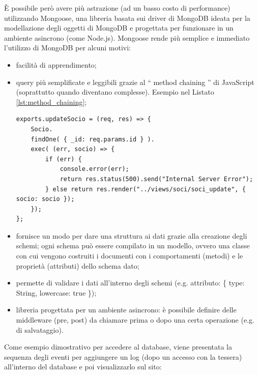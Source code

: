 \documentclass[12pt]{report}
\begin{document}
È possibile però avere più astrazione (ad un basso costo di performance) utilizzando Mongoose, una libreria basata sui driver di MongoDB ideata per la modellazione degli oggetti di MongoDB e progettata per funzionare in un ambiente asincrono (come Node.js). Mongoose rende più semplice e immediato l'utilizzo di MongoDB per alcuni motivi:
\begin{itemize}
	\item facilità di apprendimento;
	\item query più semplificate e leggibili grazie al \textquotedblleft{} method chaining \textquotedblright{} di JavaScript (soprattutto quando diventano complesse). Esempio nel Listato \ref{lst:method_chaining};
\begin{lstlisting}[caption={Esempio di query con \emph{mongoose}. Questa funzione cerca nel database dei soci per l'identificatore passato tra i parametri e poi carica la pagina per aggiornare il socio trovato}, label={lst:method_chaining}, xleftmargin=\dimexpr-\leftmargini]
exports.updateSocio = (req, res) => {
	Socio.
	findOne( { _id: req.params.id } ).
	exec( (err, socio) => {
		if (err) {
			console.error(err);
			return res.status(500).send("Internal Server Error");
		} else return res.render("../views/soci/soci_update", { socio: socio });
	});
};
\end{lstlisting}

	\item fornisce un modo per dare una struttura ai dati grazie alla creazione degli schemi; ogni schema può essere compilato in un modello, ovvero una classe con cui vengono costruiti i documenti con i comportamenti (metodi) e le proprietà (attributi) dello schema dato;
	\item permette di validare i dati all'interno degli schemi (e.g. attributo: \{ type: String, lowercase: true \});
	\item libreria progettata per un ambiente asincrono: è possibile definire delle middleware (pre, post) da chiamare prima o dopo una certa operazione (e.g. di salvataggio). 
\end{itemize}
Come esempio dimostrativo per accedere al database, viene presentata la sequenza degli eventi per aggiungere un log (dopo un accesso con la tessera) all'interno del database e poi visualizzarlo sul sito:
\end{document}
